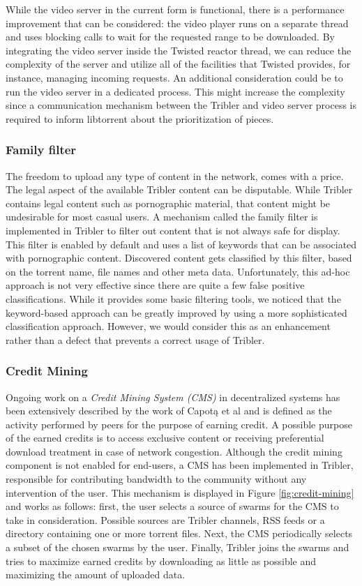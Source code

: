 While the video server in the current form is functional, there is a performance improvement that can be considered: the video player runs on a separate thread and uses blocking calls to wait for the requested range to be downloaded. By integrating the video server inside the Twisted reactor thread, we can reduce the complexity of the server and utilize all of the facilities that Twisted provides, for instance, managing incoming requests. An additional consideration could be to run the video server in a dedicated process. This might increase the complexity since a communication mechanism between the Tribler and video server process is required to inform libtorrent about the prioritization of pieces.

\subsubsection{\textbf{Family filter}}
The freedom to upload any type of content in the network, comes with a price. The legal aspect of the available Tribler content can be disputable. While Tribler  contains legal content such as pornographic material, that content might be undesirable for most casual users. A mechanism called the family filter is  implemented in Tribler to filter out content that is not always safe for display. This filter is enabled by default and uses a list of keywords that can be associated with pornographic content. Discovered content gets classified by this filter, based on the torrent name, file names and other meta data. Unfortunately, this ad-hoc approach is not very effective since there are quite a few false positive classifications. While it provides some basic filtering tools, we noticed that the keyword-based approach can be greatly improved by using a more sophisticated classification approach. However, we would consider this as an enhancement rather than a defect that prevents a correct usage of Tribler.

\subsubsection{\textbf{Credit Mining}}
Ongoing work on a \emph{Credit Mining System (CMS)} in decentralized systems has been extensively described by the work of Capot\k{a} et al\cite{capotka2015decentralized} and is defined as the activity performed by peers for the purpose of earning credit. A possible purpose of the earned credits is to access exclusive content or receiving preferential download treatment in case of network congestion. Although the credit mining component is not enabled for end-users, a CMS has been implemented in Tribler, responsible for contributing bandwidth to the community without any intervention of the user. This mechanism is displayed in Figure \ref{fig:credit-mining} and works as follows: first, the user selects a source of swarms for the CMS to take in consideration. Possible sources are Tribler channels, RSS feeds or a directory containing one or more torrent files. Next, the CMS periodically selects a subset of the chosen swarms by the user. Finally, Tribler joins the swarms and tries to maximize earned credits by downloading as little as possible and maximizing the amount of uploaded data.\\


